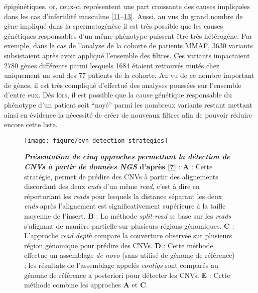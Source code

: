 \documentclass[12pt,twoside]{ugathesis}
\begin{document}
épigénétiques, or, ceux-ci représentent une part croissante des causes
impliquées dans les cas d'infertilité masculine
{[}\protect\hyperlink{ref-Carrell2011}{11}--\protect\hyperlink{ref-Dada2012}{13}{]}.
Aussi, au vus du grand nombre de gène impliqué dans la spermatogénèse il
est très possible que les causes génétiques responsables d'un même
phénotype puissent être très hétérogène. Par exemple, dans le cas de
l'analyse de la cohorte de patients MMAF, 3630 variants subsistaient
après avoir appliqué l'ensemble des filtres. Ces variants impactaient
2780 gènes différents parmi lesquels 1684 étaient retrouvés mutés chez
uniquement un seul des 77 patients de la cohorte. Au vu de ce nombre
important de gènes, il est très compliqué d'effectué des analyses
poussées sur l'ensemble d'entre eux. Dès lors, il est possible que la
cause génétique responsable du phénotype d'un patient soit ``noyé''
parmi les nombreux variants restant mettant ainsi en évidence la
nécessité de créer de nouveaux filtres afin de pouvoir réduire encore
cette liste.

\newpage

\begin{figure}

{\centering \texttt{[image: figure/cvn\_detection\_strategies]} 

}

\caption[Présentation de cinq approches permettant la détection de CNVs à partir de données NGS]{\textbf{\emph{Présentation de cinq approches
permettant la détection de CNVs à partir de données NGS} d'après
{[}\protect\hyperlink{ref-Zhao2013}{7}{]}} : \textbf{A} : Cette
stratégie, permet de prédire des CNVs à partir des alignements
discordant des deux \emph{ends} d'un même \emph{read}, c'est à dire en
répertoriant les \emph{reads} pour lesquels la distance séparant les
deux \emph{ends} après l'alignement est significativement supérieure à
la taille moyenne de l'insert. \textbf{B} : La méthode \emph{split-read}
se base sur les \emph{reads} s'alignant de manière partielle sur
plusieurs régions génomiques. \textbf{C} : L'approche \emph{read depth}
compare la couverture observée sur plusieurs région génomique pour
prédire des CNVs. \textbf{D} : Cette méthode effectue un assemblage
\emph{de novo} (sans utilisé de génome de référence) ; les résultats de
l'assemblage appelés \emph{contigs} sont comparés au génome de référence
a posteriori pour détecter les CNVs. \textbf{E} : Cette méthode combine
les approches \textbf{A} et \textbf{C}.}\label{fig:pictcnvdetection}
\end{figure}
\end{document}
